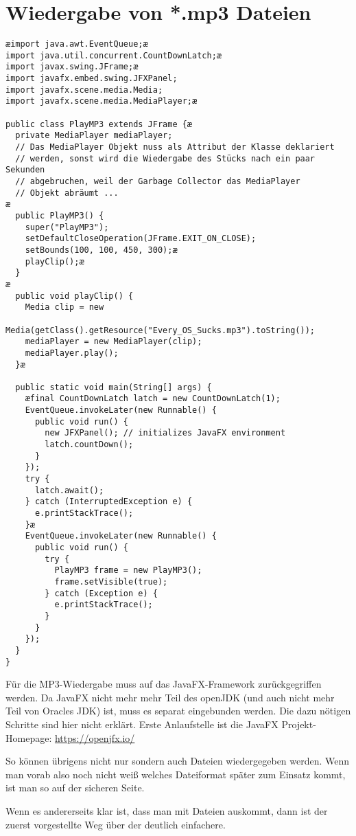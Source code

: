 \begin{minipage}{1.0\textwidth}
\section{Wiedergabe von *.mp3 Dateien}

\begin{lstlisting}
æimport java.awt.EventQueue;æ
import java.util.concurrent.CountDownLatch;æ
import javax.swing.JFrame;æ
import javafx.embed.swing.JFXPanel;
import javafx.scene.media.Media;
import javafx.scene.media.MediaPlayer;æ

public class PlayMP3 extends JFrame {æ
  private MediaPlayer mediaPlayer;  
  // Das MediaPlayer Objekt nuss als Attribut der Klasse deklariert 
  // werden, sonst wird die Wiedergabe des Stücks nach ein paar Sekunden
  // abgebruchen, weil der Garbage Collector das MediaPlayer
  // Objekt abräumt ... 
æ
  public PlayMP3() {
    super("PlayMP3");
    setDefaultCloseOperation(JFrame.EXIT_ON_CLOSE);
    setBounds(100, 100, 450, 300);æ
    playClip();æ
  }
æ
  public void playClip() {
    Media clip = new
         Media(getClass().getResource("Every_OS_Sucks.mp3").toString());
    mediaPlayer = new MediaPlayer(clip);
    mediaPlayer.play();
  }æ

  public static void main(String[] args) {
    æfinal CountDownLatch latch = new CountDownLatch(1);
    EventQueue.invokeLater(new Runnable() {
      public void run() {
        new JFXPanel(); // initializes JavaFX environment
        latch.countDown();
      }
    });
    try {
      latch.await();
    } catch (InterruptedException e) {
      e.printStackTrace();
    }æ
    EventQueue.invokeLater(new Runnable() {
      public void run() {
        try {
          PlayMP3 frame = new PlayMP3();
          frame.setVisible(true);
        } catch (Exception e) {
          e.printStackTrace();
        }
      }
    });
  }
}
\end{lstlisting}
\end{minipage}


Für die MP3-Wiedergabe muss auf das JavaFX-Framework
zurückgegriffen werden. Da JavaFX nicht mehr mehr Teil des openJDK (und auch nicht 
mehr Teil von Oracles JDK) ist, muss es separat eingebunden werden. Die dazu 
nötigen Schritte sind hier nicht erklärt. Erste Anlaufstelle ist die JavaFX 
Projekt-Homepage: \url{https://openjfx.io/}

So können übrigens nicht nur  sondern auch  Dateien
wiedergegeben werden. Wenn man vorab also noch nicht weiß welches Dateiformat
später zum Einsatz kommt, ist man so auf der sicheren Seite.

Wenn es andererseits klar ist, dass man mit  Dateien auskommt,
dann ist der zuerst vorgestellte Weg über  der deutlich
einfachere.
